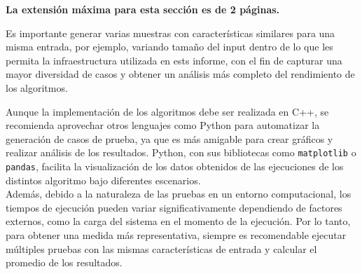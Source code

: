 \begin{mdframed}
    \textbf{La extensión máxima para esta sección es de 2 páginas.}
\end{mdframed}
Es importante generar varias muestras con características similares para una misma entrada, por ejemplo, variando tamaño del input dentro de lo que les permita la infraestructura utilizada en ests informe, con el fin de capturar una mayor diversidad de casos y obtener un análisis más completo del rendimiento de los algoritmos.\\

\begin{mdframed}
    Aunque la implementación de los algoritmos debe ser realizada en C++, se recomienda aprovechar otros lenguajes como Python para automatizar la generación de casos de prueba, ya que es más amigable para crear gráficos y realizar análisis de los resultados. Python, con sus bibliotecas como \texttt{matplotlib} o \texttt{pandas}, facilita la visualización de los datos obtenidos de las ejecuciones de los distintos algoritmo bajo diferentes escenarios.\\
    
    Además, debido a la naturaleza de las pruebas en un entorno computacional, los tiempos de ejecución pueden variar significativamente dependiendo de factores externos, como la carga del sistema en el momento de la ejecución. Por lo tanto, para obtener una medida más representativa, siempre es recomendable ejecutar múltiples pruebas con las mismas características de entrada y calcular el promedio de los resultados.
\end{mdframed}